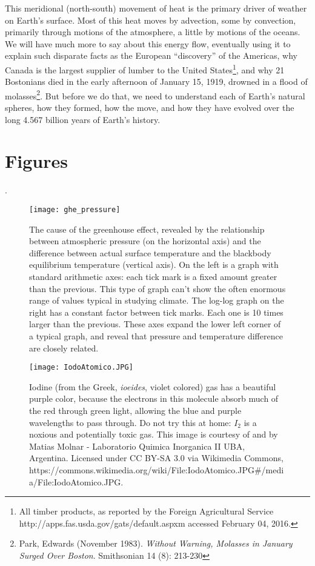 This meridional (north-south) movement of heat is the primary driver of weather on Earth's surface. Most of this heat moves by advection, some by convection, primarily through motions of the atmosphere, a little by motions of the oceans. We will have much more to say about this energy flow, eventually using it to explain such disparate facts as the European ``discovery'' of the Americas, why Canada is the largest supplier of lumber to the United States\footnote{All timber products, as reported by the Foreign Agricultural Service  http://apps.fas.usda.gov/gats/default.aspxm accessed February 04, 2016.}, and why 21 Bostonians died in the early afternoon of January 15, 1919, drowned in a flood of molasses\footnote{Park, Edwards (November 1983). \textit{Without Warning, Molasses in January Surged Over Boston}. Smithsonian 14 (8): 213-230}. But before we do that, we need to understand each of Earth's natural spheres, how they formed, how the move, and how they have evolved over the long 4.567 billion years of Earth's history. 

\section{Figures} \label{Greenhouse_Figures}
.
\newpage

\begin{figure}[p]
\centering
\texttt{[image: ghe\_pressure]}%
\caption{The cause of the greenhouse effect, revealed by the relationship between atmospheric pressure (on the horizontal axis) and the difference between actual surface temperature and the blackbody equilibrium temperature (vertical axis). On the left is a graph with standard arithmetic axes: each tick mark is a fixed amount greater than the previous. This type of graph can't show the often enormous range of values typical in studying climate. The log-log graph on the right has a constant factor between tick marks. Each one is 10 times larger than the previous. These axes expand the lower left corner of a typical graph, and reveal that pressure and temperature difference are closely related. }   
\label{fig:tghe_P}
\end{figure}

\begin{figure}[p]
\centering
\texttt{[image: IodoAtomico.JPG]}
\caption{Iodine (from the Greek, \textit{ioeides}, violet colored) gas has a beautiful purple color, because the electrons in this molecule absorb much of the red through green light, allowing the blue and purple wavelengths to pass through. Do not try this at home: $I_2$ is a noxious and potentially toxic gas. This image is courtesy of and by Matias Molnar - Laboratorio Quimica Inorganica II UBA, Argentina. Licensed under CC BY-SA 3.0 via Wikimedia Commons,  https://commons.wikimedia.org/wiki/File:IodoAtomico.JPG\#/media/File:IodoAtomico.JPG.}   
\label{fig:iodine}
\end{figure}

